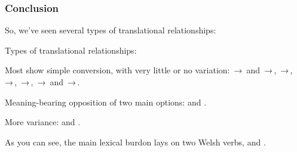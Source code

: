 \subsubsection{Conclusion}

\begin{paper}
	{\click} So, we’ve seen several types of translational relationships:
\end{paper}

\begin{hopoint}
	Types of translational relationships:
	\begin{compactitem}
		\item Most show simple conversion, with very little or no variation:
			\,→\, and \,→\,,
			\,→\,,
			\,→\,,
			\,→\,,
			\,→\, and \,→\,.
		\item Meaning-bearing opposition of two main options:
			 and .
		\item More variance:
			 and .
	\end{compactitem}
\end{hopoint}

\begin{paper}
	As you can see, the main lexical burdon lays on two Welsh verbs,  and .
\end{paper}
